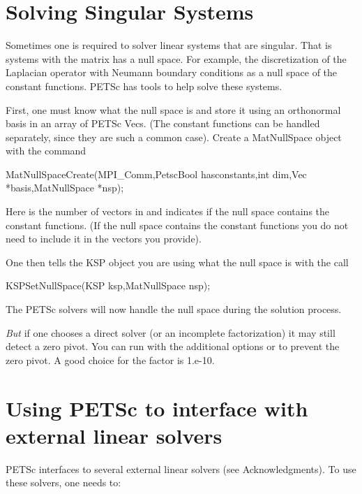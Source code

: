 \section{Solving Singular Systems}
\label{sec_singular}

Sometimes one is required to solver linear systems that are singular. 
That is systems with the matrix has a null space. For example, the 
discretization of the Laplacian operator with Neumann boundary conditions
as a null space of the constant functions. PETSc has tools to help
solve these systems.

First, one must know what the null space is and store it using an orthonormal basis 
in an array of PETSc Vecs. (The constant functions can be handled separately, since
they are such a common case). Create a MatNullSpace object with the command
\begin{tabbing}
MatNullSpaceCreate(MPI\_Comm,PetscBool  hasconstants,int dim,Vec *basis,MatNullSpace *nsp);
\end{tabbing}
Here  is the number of vectors in  and  indicates
if the null space contains the constant functions. (If the null space contains the constant
functions you do not need to include it in the  vectors you provide).

One then tells the KSP object you are using what the null space is with the call
\begin{tabbing}
KSPSetNullSpace(KSP ksp,MatNullSpace nsp);
\end{tabbing}
The PETSc solvers will now handle the null space during the solution process.

\emph{But} if one chooses a direct solver (or an incomplete factorization)
it may still detect a zero pivot. 
You can run with the additional options  
 or   to 
prevent the zero pivot. A good choice for the  factor is 1.e-10.

\section{Using PETSc to interface with external linear solvers}
\label{sec_externalsol}

PETSc interfaces to several external linear solvers (see Acknowledgments).
To use these solvers, one needs to:

